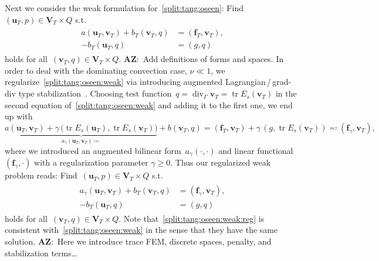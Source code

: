 \documentclass[12pt]{article}
\newcommand{\vect}[1]{\boldsymbol{\mathbf{#1}}}
\DeclareMathOperator{\Div}{div}
\DeclareMathOperator{\Tr}{tr}
\newcommand{\AZ}[1]{{\color{red}\textbf{AZ}:~#1}}
\begin{document}
Next we consider the weak formulation for~\eqref{split:tang:oseen}: Find~$(\vect u_T, p) \in \vect V_T \times Q$ s.t.
\begin{align}\begin{split}\label{split:tang:oseen:weak}
	a(\vect u_T, \vect v_T) + b_T(\vect v_T, q) &= (\vect f_T, \vect v_T), \\
	-b_T(\vect u_T, q) &= (g, q)
\end{split}\end{align}
holds for all~$(\vect v_T, q) \in \vect V_T \times Q$. \AZ{Add definitions of forms and spaces.} In order to deal with the dominating convection case, $\nu \ll 1$, we regularize~\eqref{split:tang:oseen:weak} via introducing augmented Lagrangian\,/\,grad-div type stabilization~\cite{benzi2006augmented}. Choosing test function~$q = \Div_\Gamma\vect v_T = \Tr E_s(\vect v_T)$ in the second equation of~\eqref{split:tang:oseen:weak} and adding it to the first one, we end up with
$$
	\underbrace{a(\vect u_T, \vect v_T) + \gamma\,\big(\Tr E_s(\vect u_T), \Tr E_s(\vect v_T)\big)}_{a_\gamma(\vect u_T, \vect v_T) \coloneqq} + b(\vect v_T, q) = (\vect f_T, \vect v_T) + \gamma\,(g, \Tr E_s(\vect v_T)) \eqqcolon (\vect f_\gamma, \vect v_T),
$$
where we introduced an augmented bilinear form~$a_\gamma(\cdot, \cdot)$ and linear functional~$(\vect f_\gamma,\cdot)$ with a regularization parameter $\gamma \ge 0$. Thus our regularized weak problem reads: Find~$(\vect u_T, p) \in \vect V_T \times Q$ s.t.
\begin{align}\begin{split}\label{split:tang:oseen:weak:reg}
	a_\gamma(\vect u_T, \vect v_T) + b_T(\vect v_T, q) &= (\vect f_\gamma, \vect v_T), \\
	-b_T(\vect u_T, q) &= (g, q)
\end{split}\end{align}
holds for all~$(\vect v_T, q) \in \vect V_T \times Q$. Note that~\eqref{split:tang:oseen:weak:reg} is consistent with~\eqref{split:tang:oseen:weak} in the sense that they have the same solution. \AZ{Here we introduce trace FEM, discrete spaces, penalty, and stabilization terms\dots}
\end{document}
